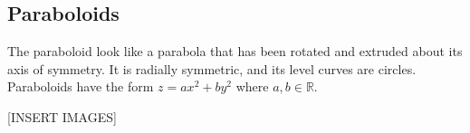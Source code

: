 \subsection{Paraboloids}
\noindent
The paraboloid look like a parabola that has been rotated and extruded about its axis of symmetry. It is radially symmetric, and its level curves are circles. Paraboloids have the form $z = ax^2 + by^2$ where $a,b \in \mathbb{R}$.

[INSERT IMAGES]